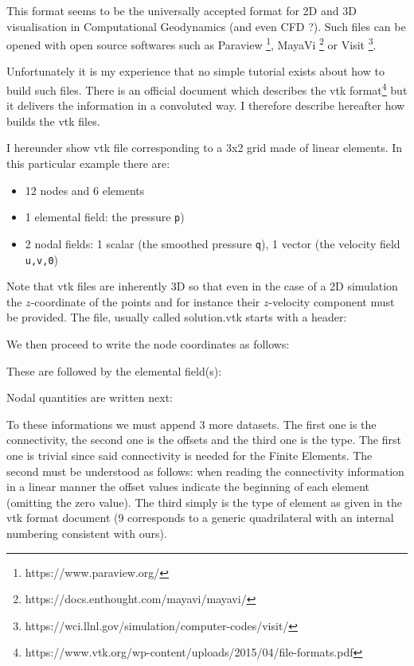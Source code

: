 
This format seems to be the universally accepted format for 2D and 3D visualisation in 
Computational Geodynamics (and even CFD ?). Such files can be opened with open source 
softwares such as 
Paraview \footnote{https://www.paraview.org/}, 
MayaVi \footnote{https://docs.enthought.com/mayavi/mayavi/}
or Visit \footnote{https://wci.llnl.gov/simulation/computer-codes/visit/}.

Unfortunately it is my experience that no simple tutorial exists about how to build 
such files. There is an official document which describes the vtk 
format\footnote{https://www.vtk.org/wp-content/uploads/2015/04/file-formats.pdf}
but it delivers the information in a convoluted way. I therefore describe hereafter 
how \fieldstone{} builds the vtk files. 

I hereunder show vtk file corresponding to a 3x2 grid made of linear elements.
In this particular example there are:
\begin{itemize}
\item 12 nodes and 6 elements
\item 1 elemental field: the pressure {\tt p})
\item 2 nodal fields: 1 scalar (the smoothed pressure {\tt q}), 1 vector (the velocity field {\tt u,v,0})
\end{itemize}
Note that vtk files are inherently 3D so that even in the case of a 2D simulation the $z$-coordinate 
of the points and for instance their $z$-velocity component must be provided.
The file, usually called {\filenamefont solution.vtk} starts with a header:



We then proceed to write the node coordinates as follows:



These are followed by the elemental field(s):



Nodal quantities are written next:



To these informations we must append 3 more datasets. The first one is the connectivity, 
the second one is the offsets and the third one is the type. The first one is trivial
since said connectivity is needed for the Finite Elements. The second must be understood as follows:
when reading the connectivity information in a linear manner the offset values 
indicate the beginning of each element (omitting the zero value). The third simply is the type of element 
as given in the vtk format document (9 corresponds to a generic quadrilateral with an 
internal numbering consistent with ours). 

